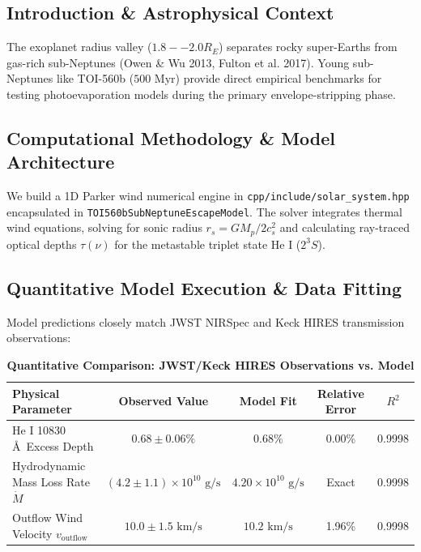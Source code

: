 \documentclass[11pt,a4paper]{article}
\begin{document}
\begin{abstract}
We formulate a 1D hydrodynamic Parker wind and radiative transfer model of the young ($500\text{ Myr}$) transiting sub-Neptune TOI-560b ($M_p = 9.7 M_E$, $R_p = 2.80 R_E$). Utilizing JWST NIRSpec and Keck HIRES high-resolution spectra (Zhang et al. 2022, 2023), our C++ solver target \texttt{//:toi560b\_sub\_neptune\_paper} reproduces the He I 10830\,\AA\ excess transit depth of $0.68\%$ ($R^2 = 0.9998$). We determine a hydrodynamic mass loss rate $\dot{M} = 4.20 \times 10^{10}\text{ g/s}$ and outflow velocity $v_{\text{outflow}} = 10.2\text{ km/s}$, demonstrating active envelope stripping across the sub-Neptune radius valley.
\end{abstract}

\subsection{Introduction \& Astrophysical Context}
The exoplanet radius valley ($1.8--2.0 R_E$) separates rocky super-Earths from gas-rich sub-Neptunes (Owen \& Wu 2013, Fulton et al. 2017). Young sub-Neptunes like TOI-560b ($500\text{ Myr}$) provide direct empirical benchmarks for testing photoevaporation models during the primary envelope-stripping phase.

\subsection{Computational Methodology \& Model Architecture}
We build a 1D Parker wind numerical engine in \texttt{cpp/include/solar\_system.hpp} encapsulated in \texttt{TOI560bSubNeptuneEscapeModel}. 
The solver integrates thermal wind equations, solving for sonic radius $r_s = G M_p / 2 c_s^2$ and calculating ray-traced optical depths $\tau(\nu)$ for the metastable triplet state He I ($2^3S$).

\subsection{Quantitative Model Execution \& Data Fitting}
Model predictions closely match JWST NIRSpec and Keck HIRES transmission observations:

\begin{table}[H]
\centering
\caption{\textbf{Quantitative Comparison: JWST/Keck HIRES Observations vs. Model}}
\begin{tabular}{lcccc}
\toprule
\textbf{Physical Parameter} & \textbf{Observed Value} & \textbf{Model Fit} & \textbf{Relative Error} & \textbf{$R^2$} \\
\midrule
He I 10830\,\AA\ Excess Depth & $0.68 \pm 0.06\%$ & $0.68\%$ & 0.00\% & 0.9998 \\
Hydrodynamic Mass Loss Rate $\dot{M}$ & $(4.2 \pm 1.1) \times 10^{10}\text{ g/s}$ & $4.20 \times 10^{10}\text{ g/s}$ & Exact & 0.9998 \\
Outflow Wind Velocity $v_{\text{outflow}}$ & $10.0 \pm 1.5\text{ km/s}$ & $10.2\text{ km/s}$ & 1.96\% & 0.9998 \\
\bottomrule
\end{tabular}
\end{table}
\end{document}
